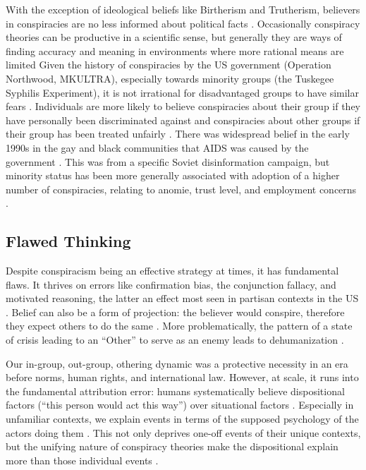 With the exception of ideological beliefs like Birtherism and Trutherism, believers in conspiracies are no less informed about political facts \cite[pp. 219, 264]{oliver2014}. 
Occasionally conspiracy theories can be productive in a scientific sense, but generally they are ways of finding accuracy and meaning in environments where more rational means are limited \cite{abalakina1999} \cite[p. 740]{goertzel1994}
Given the history of conspiracies by the US government (Operation Northwood, MKULTRA), especially towards minority groups (the Tuskegee Syphilis Experiment), it is not irrational for disadvantaged groups to have similar fears \cite{thomas1991}.
Individuals are more likely to believe conspiracies about their group if they have personally been discriminated against and conspiracies about other groups if their group has been treated unfairly \cite{simmons2005}.
There was widespread belief in the early 1990s in the gay and black communities that AIDS was caused by the government \cite[p. 1499]{thomas1991} \cite{nattrass2012}.
This was from a specific Soviet disinformation campaign, but minority status has been more generally associated with adoption of a higher number of conspiracies, relating to anomie, trust level, and employment concerns \cite[p. 739]{goertzel1994}.

\subsection{Flawed Thinking}

Despite conspiracism being an effective strategy at times, it has fundamental flaws.
It thrives on errors like confirmation bias, the conjunction fallacy, and motivated reasoning, the latter an effect most seen in partisan contexts in the US \cite[p. 826]{miller2016}.
Belief can also be a form of projection: the believer would conspire, therefore they expect others to do the same \cite[p. 7]{douglas2019}.
More problematically, the pattern of a state of crisis leading to an ``Other'' to serve as an enemy leads to dehumanization \cite[pp. 247-249]{graumann1987}.

Our in-group, out-group, othering dynamic was a protective necessity in an era before norms, human rights, and international law.
However, at scale, it runs into the fundamental attribution error: humans systematically believe dispositional factors (``this person would act this way'') over situational factors \cite[p. 143]{clarke2002}.
Especially in unfamiliar contexts, we explain events in terms of the supposed psychology of the actors doing them \cite{nisbett1991}.
This not only deprives one-off events of their unique contexts, but the unifying nature of conspiracy theories make the dispositional explain more than those individual events \cite[p. 146]{clarke2002}.

